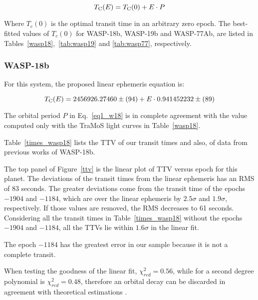 \begin{equation} \label{eq1}
T_{\rm C}(E)=T_{\rm C}(0)+E \cdot P
\end{equation}

Where $T_{c}(0)$ is the optimal transit time in an arbitrary zero epoch. The best-fitted values of $T_{c}(0)$ for WASP-18b, WASP-19b and WASP-77Ab, are listed in Tables~\ref{wasp18},~\ref{tab:wasp19} and \ref{tab:wasp77}, respectively.


\subsubsection{WASP-18b}
For this system, the proposed linear ephemeris equation is:

\begin{equation} \label{eq1_w18}
T_{\rm C}(E)=2456926.27460\pm(94)+E \cdot 0.941452232\pm(89)
\end{equation}

The orbital period $P$ in Eq.~\ref{eq1_w18} is in complete agreement with the value computed only with the TraMoS light curves in Table~\ref{wasp18}.

Table~\ref{times_wasp18} lists the TTV of our transit times and also, of data from previous works \citep{Triaud2010,Hellier2009,Maxted2013b} of WASP-18b. 

The top panel of Figure~\ref{ttv} is the linear plot of TTV versus epoch for this planet. The deviations of the transit times from the linear ephemeris has an RMS of 83 seconds. The greater deviations come from the transit time of the epochs $-1904$ and $-1184$, which are over the linear ephemeris by $2.5\sigma$ and $1.9\sigma$, respectively. If those values are removed, the RMS decreases to 61 seconds. Considering all the transit times in Table~\ref{times_wasp18} without the epochs $-1904$ and $-1184$, all the TTVs lie within $1.6\sigma$ in the linear fit. 

The epoch $-1184$ has the greatest error in our sample because it is not a complete transit.

When testing the goodness of the linear fit, $\chi^{2}_{red} =0.56$, while for a second degree polynomial is $\chi^{2}_{red}=0.48$, therefore an orbital decay can be discarded in agreement with theoretical estimations \citep{CollierCameron2018}.  


